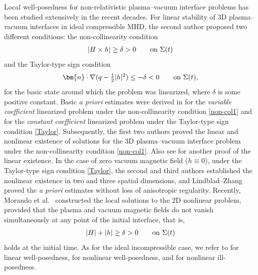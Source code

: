 \documentclass[twoside,11pt]{article}
\numberwithin{equation}{section}
\begin{document}
Local well-posedness for non-relativistic plasma--vacuum interface problems has been studied extensively in the recent decades.
For linear stability of 3D plasma--vacuum interfaces in ideal compressible MHD,
the second author \cite{T10MR2718711} proposed two different conditions:
the non-collinearity condition
\begin{align} \label{non-col1}
	|H\times h|\geq \delta>0\qquad \textnormal{on }\Sigma(t)
\end{align}
and  the Taylor-type sign condition
\begin{align} \label{Taylor}
	 \bm{n}\cdot \nabla (q-\tfrac{1}{2}|h|^2)\leq -\delta<0\qquad \textnormal{on }\Sigma(t),
\end{align}
for the basic state around which the problem was linearized,
where $\delta$ is some positive constant.
Basic {\it a priori} estimates were derived in \cite{T10MR2718711} for the {\it variable coefficient} linearized problem under the non-collinearity condition \eqref{non-col1} and for the {\it constant coefficient} linearized problem under the Taylor-type sign condition \eqref{Taylor}.
Subsequently, the first two authors \cite{ST14MR3151094,ST13MR3148595} proved the linear and nonlinear existence of solutions for the 3D plasma--vacuum interface problem under the non-collinearity condition \eqref{non-col1}.  Also see \cite{STW23MR4654316} for another proof of the linear existence.
In the case of zero vacuum magnetic field ($h\equiv 0$),
under the Taylor-type sign condition \eqref{Taylor},
the second and third authors \cite{TW21MR4201624} established
the nonlinear existence in two and three spatial dimensions,
and {\sc Lindblad--Zhang} \cite{LZ23MR4632835} proved
the {\it a priori} estimates without loss of anisotropic regularity.
Recently, {\sc Morando et al.}~\cite{MSTTY24MR4754746} constructed the local solutions to the 2D nonlinear problem, provided that the plasma and vacuum magnetic fields do not vanish simultaneously at any point of the initial interface, that is,
\begin{align} \label{non-vanishing}
	|H|+|h|\geq \delta>0\qquad \textnormal{on }\Sigma(t)
\end{align}
holds at the initial time.
As for the ideal incompressible case, we refer to \cite{MTT14MR3237563,HL21MR4295166} for linear well-posedness, \cite{H17MR3614754,HL14MR3187678,SWZ19MR3981394,GW19MR3980843,LL26MR4976713,LX25MR4861065,Z24MR4668328} for nonlinear well-posedness,
and \cite{HL20MR4093862} for nonlinear ill-posedness.
\end{document}
